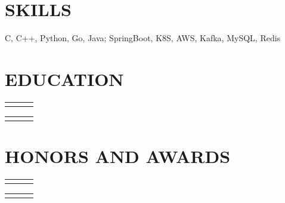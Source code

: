\documentclass[a4paper,12pt]{article}
\newcommand{\threeColumn}[3]{
  \begin{tabularx}{\textwidth}{>{\setlength\hsize{0.85\hsize}}X>{\setlength\hsize{1.3\hsize}}X>{\setlength\hsize{0.85\hsize}}X}
    \raggedright\arraybackslash{#1} & \centering{#2} & \raggedleft\arraybackslash{#3} \\
  \end{tabularx}
}
\newcommand{\threeColumnTight}[3]{
  \begin{tabularx}{\textwidth}{>{\setlength\hsize{0.95\hsize}}X>{\setlength\hsize{1.1\hsize}}X>{\setlength\hsize{0.95\hsize}}X}
    \raggedright\arraybackslash{#1} & \centering{#2} & \raggedleft\arraybackslash{#3} \\
  \end{tabularx}
}
\begin{document}
\section{SKILLS}

C, C++, Python, Go, Java; SpringBoot, K8S, AWS, Kafka, MySQL, Redis

\section{EDUCATION}
\threeColumn {M.S. in Computer Science}{Your University, China}{Sep, 2000 - Jul, 2004}
\threeColumn {B.S. in Computer Science}{Your University, China}{Sep, 2004 - Jul, 2008}
\vspace{-1em}

\section{HONORS AND AWARDS}
\threeColumnTight {Your honors and awards}{Your Company}{2000}
\threeColumnTight {Your honors and awards}{Your University}{2000}
\end{document}

